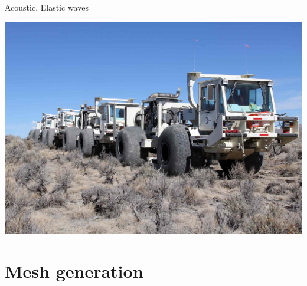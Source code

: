 \documentclass[handout]{beamer}
{
\usepackage{fullpage}
\usepackage{hyperref}
\usepackage{amssymb} 
}
\begin{document}
\begin{frame}
\begin{center}
\begin{minipage}{0.45\textwidth}
{\begin{block}{Acoustic, Elastic waves}
\begin{itemize}
   \end{itemize} 
   \end{block}}
   \end{minipage}
   \hfill
   \begin{minipage}{0.45\textwidth}
   \includegraphics[height=0.6\textwidth,width=\textwidth]{figures/trucks.jpg}
   \end{minipage}
  
  \end{center}
\end{frame}



\section{Mesh generation}
\end{document}
